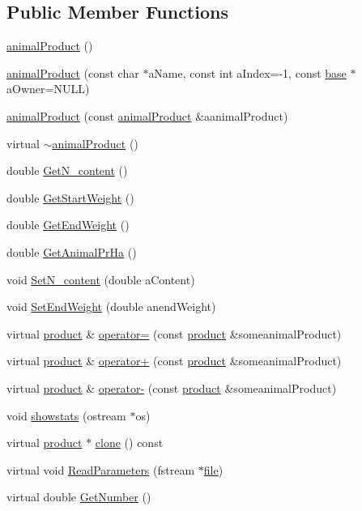 \subsection*{Public Member Functions}
\begin{DoxyCompactItemize}
\item 
\hyperlink{classanimal_product_a0afba5541c9f4216fb2ce2cbe806929b}{animalProduct} ()
\item 
\hyperlink{classanimal_product_ab8322e1a7aa9fc85602834cdc9e524f5}{animalProduct} (const char $\ast$aName, const int aIndex=-\/1, const \hyperlink{classbase}{base} $\ast$aOwner=NULL)
\item 
\hyperlink{classanimal_product_acc81bed1cce74a9f6f6aad4844e0bdfc}{animalProduct} (const \hyperlink{classanimal_product}{animalProduct} \&aanimalProduct)
\item 
virtual \hyperlink{classanimal_product_a66dd3ca277815d21b0dc42df5c3e9245}{$\sim$animalProduct} ()
\item 
double \hyperlink{classanimal_product_a95a133a9ad5921133cf2fd42b2d88835}{GetN\_\-content} ()
\item 
double \hyperlink{classanimal_product_a8232ade0a8ba3fb2f94704f934d163d9}{GetStartWeight} ()
\item 
double \hyperlink{classanimal_product_a00e6801d87aa22c00f02f1e00f1ceebf}{GetEndWeight} ()
\item 
double \hyperlink{classanimal_product_a284f65c7bfe07411282b8e5a5afe3d1f}{GetAnimalPrHa} ()
\item 
void \hyperlink{classanimal_product_ad101c1731a1048cdc54d290fd38b6467}{SetN\_\-content} (double aContent)
\item 
void \hyperlink{classanimal_product_af704d07b4515268baf6dff12906299aa}{SetEndWeight} (double anendWeight)
\item 
virtual \hyperlink{classproduct}{product} \& \hyperlink{classanimal_product_a4d2a737f963def9fec349b7f49e85d7c}{operator=} (const \hyperlink{classproduct}{product} \&someanimalProduct)
\item 
virtual \hyperlink{classproduct}{product} \& \hyperlink{classanimal_product_a80febd49f670e55f887240f7c1f65662}{operator+} (const \hyperlink{classproduct}{product} \&someanimalProduct)
\item 
virtual \hyperlink{classproduct}{product} \& \hyperlink{classanimal_product_ad7c934680a4e21b36ff1fb8626d4621e}{operator-\/} (const \hyperlink{classproduct}{product} \&someanimalProduct)
\item 
void \hyperlink{classanimal_product_a22f3158bf013dbbc8519987dee8a34ff}{showstats} (ostream $\ast$os)
\item 
virtual \hyperlink{classproduct}{product} $\ast$ \hyperlink{classanimal_product_a46df4e113bcf6d492c31250569966806}{clone} () const 
\item 
virtual void \hyperlink{classanimal_product_a5fb92897386b34edf51415f88806dd03}{ReadParameters} (fstream $\ast$\hyperlink{classbase_a3af52ee9891719d09b8b19b42450b6f6}{file})
\item 
virtual double \hyperlink{classanimal_product_a398f9c68eb23f28d14d5a365eebd091a}{GetNumber} ()
\end{DoxyCompactItemize}
